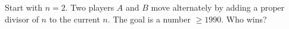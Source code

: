 Start with $n = 2$. Two players $A$ and $B$ move alternately by adding a proper divisor of $n$ to the current $n$. The goal is a number $\geq 1990$. Who wins?
